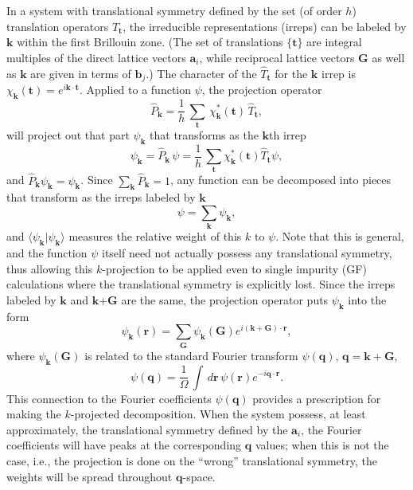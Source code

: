 \documentclass[aps,prb,showpacs,twocolumn,reprint,superscriptaddress]{revtex4-1}
\begin{document}
In a system with translational symmetry defined by the set (of order $h$) translation operators
$\hat{T}_\mathbf{t}$, the irreducible representations (irreps) can be labeled by $\mathbf{k}$ within the
first Brillouin zone.  (The set of translations $\lbrace\mathbf{t}\rbrace$ are integral multiples
of the direct lattice
vectors $\mathbf{a}_i$, while reciprocal lattice vectors $\mathbf{G}$ as well as $\mathbf{k}$ are given in
terms of $\mathbf{b}_j$.) The character of
the $\hat{T}_\mathbf{t}$ for the $\mathbf{k}$ irrep is
$\chi_\mathbf{k}(\mathbf{t})= e^{i\mathbf{k}\cdot\mathbf{t}}$. Applied to a function $\psi$, the projection operator
%
\begin{equation}
 \hat{P}_\mathbf{k} = \frac{1}{h}\, \sum_\mathbf{t}\, \chi^*_\mathbf{k}(\mathbf{t})\, \hat{T}_\mathbf{t},
\end{equation}
will project out that part $\psi_\mathbf{k}$ that transforms as the $\mathbf{k}$th irrep
\begin{equation}
 \psi_\mathbf{k} = \hat{P}_\mathbf{k}\, \psi = \frac{1}{h} \,
\sum_\mathbf{t} \chi^*_\mathbf{k}(\mathbf{t}) \hat{T}_\mathbf{t} \psi ,
\end{equation}
and $\hat{P}_\mathbf{k} \psi_\mathbf{k} = \psi_\mathbf{k}$. Since $\sum_\mathbf{k} \hat{P}_\mathbf{k} = 1$,
any function can be decomposed into pieces that transform as the irreps labeled by $\mathbf{k}$
\begin{equation}
\psi = \sum_\mathbf{k} \psi_\mathbf{k} ,
\end{equation}
and $\langle\psi_{\mathbf{k}}|\psi_{\mathbf{k}}\rangle$ measures the relative weight of this $k$ to
$\psi$. 
Note that this is general, and the function $\psi$ itself need not actually possess any translational
symmetry, thus allowing this $k$-projection to be applied even to single impurity (GF) calculations where
the translational symmetry is explicitly lost. Since the irreps labeled by $\mathbf{k}$ and
$\mathbf{k}$+$\mathbf{G}$ are the same, the projection operator puts $\psi_\mathbf{k}$ into the form
\begin{equation}
 \psi_\mathbf{k}(\mathbf{r}) = \sum_\mathbf{G} \psi_\mathbf{k}(\mathbf{G}) e^{i(\mathbf{k}+\mathbf{G})\cdot\mathbf{r}}
,
\end{equation}
where $\psi_\mathbf{k}(\mathbf{G})$ is related to the standard Fourier transform $\psi(\mathbf{q})$,
$\mathbf{q}=\mathbf{k}+\mathbf{G}$,
\begin{equation}
 \psi(\mathbf{q}) = \frac{1}{\Omega} \,
     \int \, d\mathbf{r} \, \psi(\mathbf{r}) e^{-i\mathbf{q}\cdot\mathbf{r}} .
\label{eq-fourier}
\end{equation}
This connection to the Fourier coefficients $\psi(\mathbf{q})$ provides a prescription for making the
$k$-projected decomposition. When the system possess, at least approximately, the translational symmetry
defined by the $\mathbf{a}_i$, the Fourier coefficients will have peaks at the corresponding $\mathbf{q}$
values; when this is not the case, i.e., the projection is done on the ``wrong'' translational symmetry,
the weights will be spread throughout $\mathbf{q}$-space.
\end{document}
